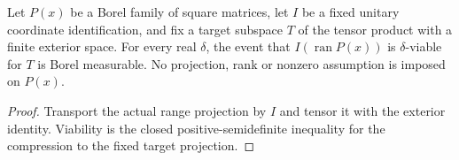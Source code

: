 \begin{theorem}
    \label{thm:borel_viability_matrix_range}
    \leanok
    Let $P(x)$ be a Borel family of square matrices, let $I$ be a fixed
    unitary coordinate identification, and fix a target subspace $T$ of
    the tensor product with a finite exterior space. For every real
    $\delta$, the event that $I(\operatorname{ran}P(x))$ is
    $\delta$-viable for $T$ is Borel measurable. No projection, rank or
    nonzero assumption is imposed on $P(x)$.
\end{theorem}
\begin{proof}\leanok
    Transport the actual range projection by $I$ and tensor it with the
    exterior identity. Viability is the closed positive-semidefinite
    inequality for the compression to the fixed target projection.
\end{proof}
